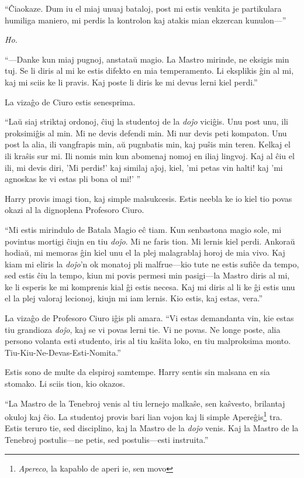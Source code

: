 ``Ĉiaokaze. Dum iu el miaj unuaj bataloj, post mi estis venkita je
partikulara humiliga maniero, mi perdis la kontrolon kaj atakis mian
ekzercan kunulon—''

\emph{Ho.}

``—Danke kun miaj pugnoj, anstataŭ magio. La Mastro mirinde, ne
eksigis min tuj. Se li diris al mi ke estis difekto en mia
temperamento. Li eksplikis ĝin al mi, kaj mi sciis ke li pravis. Kaj
poste li diris ke mi devus lerni kiel perdi.''

La vizaĝo de Ciuro estis senesprima.

``Laŭ siaj striktaj ordonoj, ĉiuj la studentoj de la \emph{doĵo}
viciĝis. Unu post unu, ili proksimiĝis al min. Mi ne devis defendi
min. Mi nur devis peti kompaton. Unu post la alia, ili vangfrapis min,
aŭ pugnbatis min, kaj puŝis min teren. Kelkaj el ili kraŝis sur
mi. Ili nomis min kun abomenaj nomoj en iliaj lingvoj. Kaj al ĉiu el
ili, mi devis diri, 'Mi perdis!' kaj similaj aĵoj, kiel, 'mi petas vin
halti! kaj 'mi agnoskas ke vi estas pli bona ol mi!' ''

Harry provis imagi tion, kaj simple malsukcesis. Estis neebla ke io
kiel tio povas okazi al la dignoplena Profesoro Ciuro.

``Mi estis mirindulo de Batala Magio eĉ tiam. Kun senbastona magio
sole, mi povintus mortigi ĉiujn en tiu \emph{doĵo}. Mi ne faris
tion. Mi lernis kiel perdi. Ankoraŭ hodiaŭ, mi memoras ĝin kiel unu el
la plej malagrablaj horoj de mia vivo. Kaj kiam mi eliris la
\emph{doĵo}'n ok monatoj pli malfrue—kio tute ne estis sufiĉe da
tempo, sed estis ĉiu la tempo, kiun mi povis permesi min pasigi—la
Mastro diris al mi, ke li esperis ke mi komprenis kial ĝi estis
necesa. Kaj mi diris al li ke ĝi estis unu el la plej valoraj
lecionoj, kiujn mi iam lernis. Kio estis, kaj estas, vera.''

La vizaĝo de Profesoro Ciuro iĝis pli amara. ``Vi estas demandanta
vin, kie estas tiu grandioza \emph{doĵo}, kaj se vi povas lerni
tie. Vi ne povas. Ne longe poste, alia persono volanta esti studento,
iris al tiu kaŝita loko, en tiu malproksima
monto. Tiu-Kiu-Ne-Devas-Esti-Nomita.''

Estis sono de multe da elspiroj samtempe. Harry sentis sin malsana en
sia stomako. Li sciis tion, kio okazos.

``La Mastro de la Tenebroj venis al tiu lernejo malkaŝe, sen kaŝvesto,
brilantaj okuloj kaj ĉio. La studentoj provis bari lian vojon kaj li
simple Apereĝis\footnote{\emph{Apereco}, la kapablo de aperi ie, sen
movo} tra. Estis teruro tie, sed disciplino, kaj la Mastro de la
\emph{doĵo} venis. Kaj la Mastro de la Tenebroj postulis—ne petis, sed
postulis—esti instruita.''  

